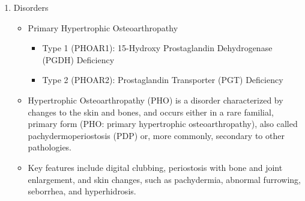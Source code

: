 \documentclass{scrartcl}
\begin{document}
\begin{enumerate}
\item Disorders
\label{sec:orga0bb7e0}
\begin{itemize}
\item Primary Hypertrophic Osteoarthropathy
\begin{itemize}
\item Type 1 (PHOAR1): 15-Hydroxy Prostaglandin Dehydrogenase (PGDH) Deficiency
\item Type 2 (PHOAR2): Prostaglandin Transporter (PGT) Deficiency
\end{itemize}

\item Hypertrophic Osteoarthropathy (PHO) is a disorder characterized by
changes to the skin and bones, and occurs either in a rare
familial, primary form (PHO: primary hypertrophic
osteoarthropathy), also called pachydermoperiostosis (PDP) or, more
commonly, secondary to other pathologies.

\item Key features include digital clubbing, periostosis with bone and
joint enlargement, and skin changes, such as pachydermia, abnormal
furrowing, seborrhea, and hyperhidrosis.
\end{itemize}
\end{enumerate}
\end{document}
